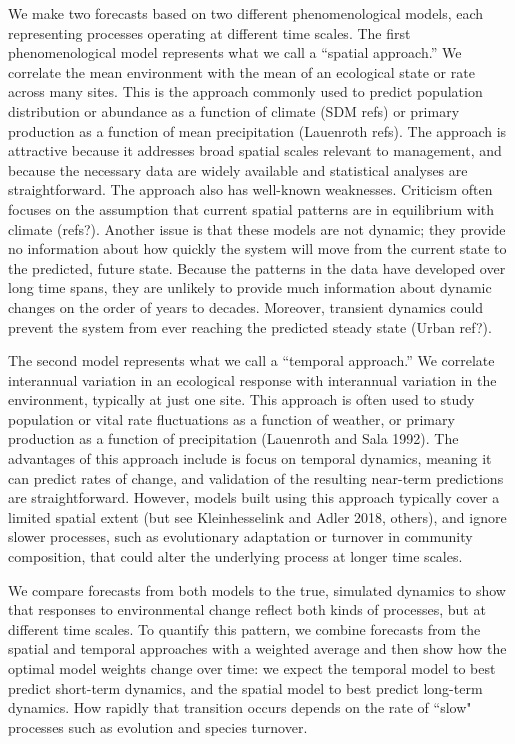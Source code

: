 \documentclass[11pt]{article}
\begin{document}
We make two forecasts based on two different phenomenological models, each representing processes operating at different time scales. 
The first phenomenological model represents what we call a ``spatial approach.'' We correlate the mean environment with the mean of an ecological state or rate 
 across many sites. This is the approach commonly used to predict population distribution or abundance as a function of climate (SDM refs) or
 primary production as a function of mean precipitation (Lauenroth refs). The approach is attractive because it addresses broad spatial scales relevant to 
 management, and because the necessary data are widely available and statistical analyses are straightforward. The approach also has well-known weaknesses.
Criticism often focuses on the assumption that current spatial patterns are in equilibrium with climate (refs?). Another issue is that these models are not dynamic; 
they provide no information about how quickly the system will move from the current state to the predicted, future state. Because the patterns in the data have developed 
over long time spans, they are unlikely to provide much information about dynamic changes on the order of years to decades. Moreover, transient dynamics could 
prevent the system from ever reaching the predicted steady state (Urban ref?). 

The second model represents what we call a ``temporal approach.'' We correlate interannual variation in an ecological response with interannual variation in the environment, 
typically at just one site. This approach is often used to study population or vital rate fluctuations as a function of weather, 
or primary production as a function of precipitation (Lauenroth and Sala 1992). The advantages of this approach include is focus on temporal dynamics, meaning it 
can predict rates of change, and validation of the resulting near-term predictions are straightforward. However, models built using this approach typically cover 
a limited spatial extent (but see Kleinhesselink  and Adler 2018, others), and ignore slower processes, such as evolutionary adaptation or turnover in community composition, 
that could alter the underlying process at longer time scales.

We compare forecasts from both models to the true, simulated dynamics to show that responses to environmental change reflect both kinds of processes, but at different time scales. To quantify this pattern, we combine forecasts from the spatial and temporal approaches with a weighted average and then show how the optimal model weights change over time: we expect the temporal model to best predict short-term dynamics, and the spatial model to best predict long-term dynamics. How rapidly that transition occurs depends on the rate of  ``slow" processes such as evolution and species turnover. 
\end{document}
